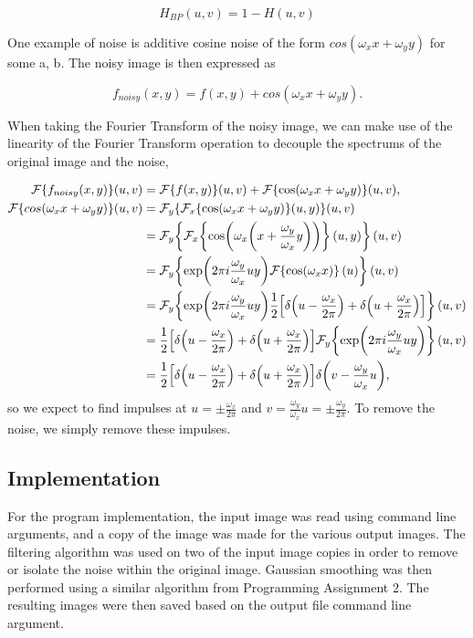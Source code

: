 \documentclass[headings=optiontoheadandtoc,listof=totoc,parskip=full]{scrartcl}
\begin{document}
\[
	H_{BP}(u,v) = 1 - H(u,v)
\]

One example of noise is additive cosine noise of the form \(cos(\omega_x x + \omega_y y)\) for some a, b. The noisy image is then expressed as 

\[
	f_{noisy} (x, y) =  f(x, y) + cos(\omega_x x + \omega_y y).
\]

When taking the Fourier Transform of the noisy image, we can make use of the linearity of the Fourier Transform operation to decouple the spectrums of the original image and the noise,

\begin{align*}
	\mathcal{F}\{f_{noisy}(x, y)\}(u,v) &= \mathcal{F}\{ f(x, y) \}(u,v) + \mathcal{F}\{\cos(\omega_x x + \omega_y y)\}(u,v),\\
	\mathcal{F}\{cos(\omega_x x + \omega_y y)\}(u,v) &= \mathcal{F}_y\{\mathcal{F}_x\{\cos(\omega_x x + \omega_y y)\}(u,y)\}(u,v)\\
		&= \mathcal{F}_y\qty{\mathcal{F}_x\qty{\cos(\omega_x \qty(x + \frac{\omega_y}{\omega_x} y))}(u,y)}(u,v)\\
		&= \mathcal{F}_y\qty{\exp(2\pi i \frac{\omega_y}{\omega_x} uy)\mathcal{F}\qty{\cos(\omega_x x)}(u)}(u,v)\\
		&= \mathcal{F}_y\qty{\exp(2\pi i \frac{\omega_y}{\omega_x} uy) \frac{1}{2}\qty[\delta \qty(u - \frac{\omega_x}{2\pi}) + \delta \qty(u + \frac{\omega_x}{2\pi})]}(u,v)\\
		&= \frac{1}{2}\qty[\delta \qty(u - \frac{\omega_x}{2\pi}) + \delta \qty(u + \frac{\omega_x}{2\pi})]\mathcal{F}_y\qty{\exp(2\pi i \frac{\omega_y}{\omega_x} uy)}(u,v)\\
		&= \frac{1}{2}\qty[\delta \qty(u - \frac{\omega_x}{2\pi}) + \delta \qty(u + \frac{\omega_x}{2\pi})]\delta \qty(v - \frac{\omega_y}{\omega_x} u),
\end{align*}
so we expect to find impulses at $u = \pm \frac{\omega_x}{2\pi}$ and $v = \frac{\omega_y}{\omega_x} u = \pm \frac{\omega_y}{2\pi}$. To remove the noise, we simply remove these impulses.

\subsection{Implementation}

For the program implementation, the input image was read using command line arguments, and a copy of the image was made for the various output images. The filtering algorithm was used on two of the input image copies in order to remove or isolate the noise within the original image. Gaussian smoothing was then performed using a similar algorithm from Programming Assignment 2. The resulting images were then saved based on the output file command line argument.
\end{document}
